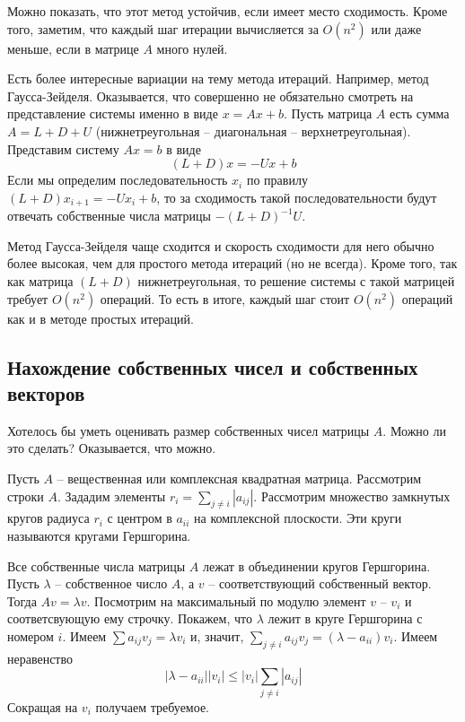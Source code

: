Можно показать, что этот метод устойчив, если имеет место сходимость. Кроме того, заметим, что каждый шаг итерации вычисляется за $O(n^2)$ или даже меньше, если в матрице $A$ много нулей.

Есть более интересные вариации на тему метода итераций. Например, метод Гаусса-Зейделя. Оказывается, что совершенно не обязательно смотреть на представление системы именно в виде $x=Ax+b$. Пусть матрица $A$ есть сумма $A=L+D+U$ (нижнетреугольная -- диагональная -- верхнетреугольная). Представим систему $Ax=b$ в виде 
$$(L+D)x=-Ux+b$$
Если мы определим последовательность $x_i$ по правилу $(L+D)x_{i+1}=-Ux_i+b$, то за сходимость такой последовательности будут отвечать собственные числа матрицы $-(L+D)^{-1}U$. 

Метод Гаусса-Зейделя чаще сходится и скорость сходимости для него обычно более высокая, чем для простого метода итераций (но не всегда). Кроме того, так как матрица $(L+D)$ нижнетреугольная, то решение системы с такой матрицей требует $O(n^2)$ операций. То есть в итоге, каждый шаг стоит $O(n^2)$ операций как и в методе простых итераций.







\subsection{Нахождение собственных чисел и собственных векторов}

Хотелось бы уметь оценивать размер собственных чисел матрицы $A$. Можно ли это сделать? Оказывается, что можно. 


Пусть $A$ -- вещественная или комплексная квадратная матрица. Рассмотрим строки $A$. Зададим элементы $r_i=\sum_{j\neq i} |a_{ij}|$. Рассмотрим множество замкнутых кругов радиуса $r_i$ с центром в $a_{ii}$ на комплексной плоскости. Эти круги называются кругами Гершгорина. 

\thrm Все собственные числа матрицы $A$ лежат в объединении кругов Гершгорина. 
\ethrm
\proof Пусть $\lambda$ -- собственное число $A$, а $v$ -- соответствующий собственный вектор. Тогда $Av=\lambda v$. Посмотрим на максимальный по модулю элемент $v$ -- $v_i$ и соответсвующую ему строчку. Покажем, что $\lambda$ лежит в круге Гершгорина с номером $i$. Имеем $\sum a_{ij}v_j =\lambda v_i$  и, значит, $\sum_{j\neq i} a_{ij}v_j= (\lambda - a_{ii})v_i $. Имеем неравенство $$|\lambda -a_{ii}||v_i| \leq |v_i|\sum_{j\neq i} |a_{ij}|$$
Сокращая на $v_i$ получаем требуемое. 
\endproof

